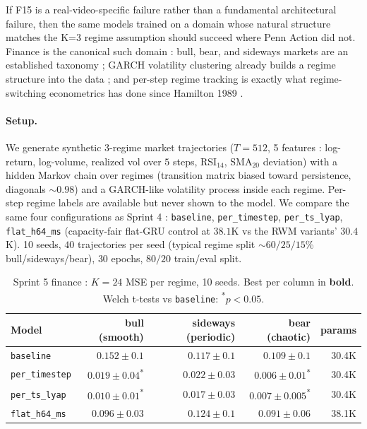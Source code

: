 \documentclass[11pt,a4paper]{article}
\begin{document}
If F15 is a real-video-specific failure rather than a fundamental
architectural failure, then the same models trained on a domain whose
natural structure matches the K=3 regime assumption should succeed
where Penn Action did not. Finance is the canonical such domain :
bull, bear, and sideways markets are an established taxonomy ; GARCH
volatility clustering already builds a regime structure into the data
; and per-step regime tracking is exactly what regime-switching
econometrics has done since Hamilton 1989 \cite{hamilton1989regime}.

\paragraph{Setup.} We generate synthetic 3-regime market trajectories
($T{=}512$, 5 features : log-return, log-volume, realized vol over
$5$ steps, RSI$_{14}$, SMA$_{20}$ deviation) with a hidden Markov
chain over regimes (transition matrix biased toward persistence,
diagonals $\sim 0.98$) and a GARCH-like volatility process inside each
regime. Per-step regime labels are available but never shown to the
model. We compare the same four configurations as Sprint 4 :
\texttt{baseline}, \texttt{per\_timestep}, \texttt{per\_ts\_lyap},
\texttt{flat\_h64\_ms} (capacity-fair flat-GRU control at $38.1$K
vs the RWM variants' $30.4$K). 10 seeds, $40$ trajectories per seed
(typical regime split $\sim 60/25/15$\% bull/sideways/bear), $30$
epochs, $80/20$ train/eval split.

\begin{table}[h]
\centering
\caption{Sprint 5 finance : $K{=}24$ MSE per regime, 10 seeds. Best per
column in \textbf{bold}. Welch t-tests vs \texttt{baseline}:
\textsuperscript{*}$p{<}0.05$.}
\label{tab:sprint5-finance}
\begin{tabular}{lrrrr}
\toprule
Model & bull (smooth) & sideways (periodic) & bear (chaotic) & params \\
\midrule
\texttt{baseline}     & $0.152 \pm 0.1$       & $0.117 \pm 0.1$       & $0.109 \pm 0.1$       & 30.4K \\
\texttt{per\_timestep}& $0.019 \pm 0.04$\textsuperscript{*} & $0.022 \pm 0.03$ & $0.006 \pm 0.01$\textsuperscript{*} & 30.4K \\
\texttt{per\_ts\_lyap}& $\bm{0.010 \pm 0.01}$\textsuperscript{*} & $\bm{0.017 \pm 0.03}$ & $\bm{0.007 \pm 0.005}$\textsuperscript{*} & 30.4K \\
\texttt{flat\_h64\_ms}& $0.096 \pm 0.03$      & $0.124 \pm 0.1$       & $0.091 \pm 0.06$      & 38.1K \\
\bottomrule
\end{tabular}
\end{table}
\end{document}
